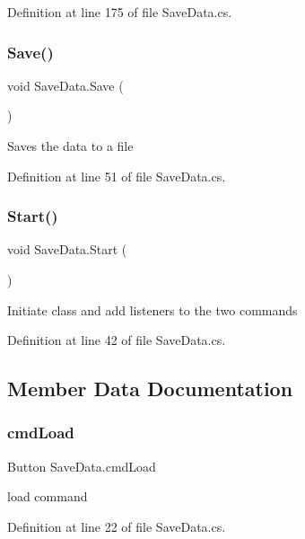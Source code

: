 Definition at line 175 of file Save\+Data.\+cs.

\mbox{\label{class_save_data_aaae8781724c7b87aeb57a6a60609b687}} 
\subsubsection{Save()}
{\footnotesize\ttfamily void Save\+Data.\+Save (\begin{DoxyParamCaption}{ }\end{DoxyParamCaption})}



Saves the data to a file 



Definition at line 51 of file Save\+Data.\+cs.

\mbox{\label{class_save_data_af64a9779645b78c6436f74eaf25c85a8}} 
\subsubsection{Start()}
{\footnotesize\ttfamily void Save\+Data.\+Start (\begin{DoxyParamCaption}{ }\end{DoxyParamCaption})}



Initiate class and add listeners to the two commands 



Definition at line 42 of file Save\+Data.\+cs.



\subsection{Member Data Documentation}
\mbox{\label{class_save_data_ad7f8cb39aa1b19f5d7b0e0bf52442b32}} 
\subsubsection{cmd\+Load}
{\footnotesize\ttfamily Button Save\+Data.\+cmd\+Load}



load command 



Definition at line 22 of file Save\+Data.\+cs.


